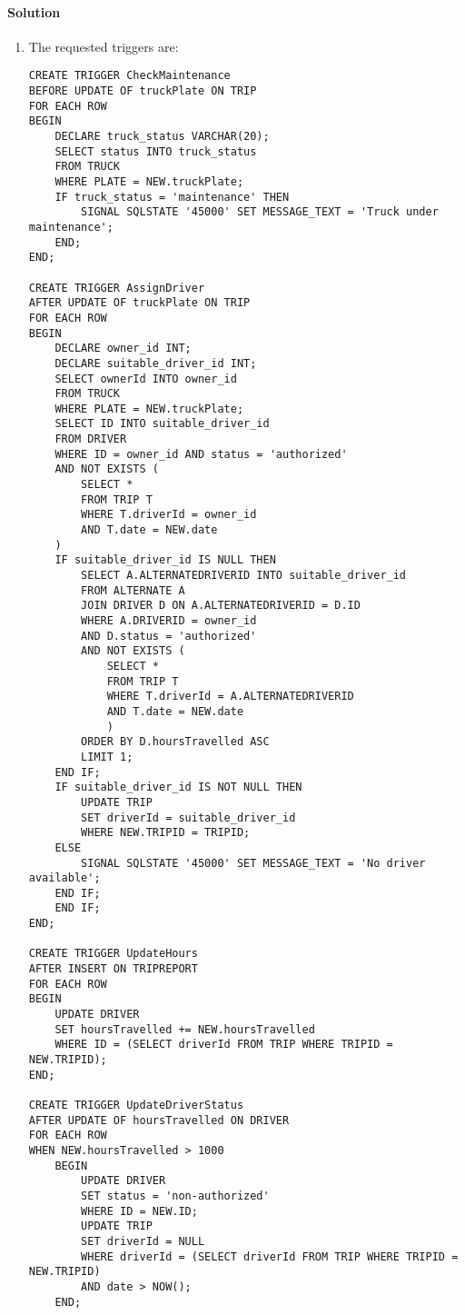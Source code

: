 \paragraph*{Solution}
\begin{enumerate}
    \item The requested triggers are: 
        \begin{lstlisting}[style=SQL]
CREATE TRIGGER CheckMaintenance
BEFORE UPDATE OF truckPlate ON TRIP
FOR EACH ROW
BEGIN
    DECLARE truck_status VARCHAR(20);
    SELECT status INTO truck_status
    FROM TRUCK
    WHERE PLATE = NEW.truckPlate;
    IF truck_status = 'maintenance' THEN
        SIGNAL SQLSTATE '45000' SET MESSAGE_TEXT = 'Truck under maintenance';
    END;
END;

CREATE TRIGGER AssignDriver
AFTER UPDATE OF truckPlate ON TRIP
FOR EACH ROW
BEGIN
    DECLARE owner_id INT;
    DECLARE suitable_driver_id INT;
    SELECT ownerId INTO owner_id
    FROM TRUCK
    WHERE PLATE = NEW.truckPlate;
    SELECT ID INTO suitable_driver_id
    FROM DRIVER
    WHERE ID = owner_id AND status = 'authorized'
    AND NOT EXISTS (
        SELECT *
        FROM TRIP T
        WHERE T.driverId = owner_id
        AND T.date = NEW.date
    )
    IF suitable_driver_id IS NULL THEN
        SELECT A.ALTERNATEDRIVERID INTO suitable_driver_id
        FROM ALTERNATE A
        JOIN DRIVER D ON A.ALTERNATEDRIVERID = D.ID
        WHERE A.DRIVERID = owner_id
        AND D.status = 'authorized'
        AND NOT EXISTS (
            SELECT *
            FROM TRIP T
            WHERE T.driverId = A.ALTERNATEDRIVERID
            AND T.date = NEW.date
            )
        ORDER BY D.hoursTravelled ASC
        LIMIT 1;
    END IF;
    IF suitable_driver_id IS NOT NULL THEN
        UPDATE TRIP
        SET driverId = suitable_driver_id
        WHERE NEW.TRIPID = TRIPID;
    ELSE
        SIGNAL SQLSTATE '45000' SET MESSAGE_TEXT = 'No driver available';
    END IF;
    END IF;
END;

CREATE TRIGGER UpdateHours
AFTER INSERT ON TRIPREPORT
FOR EACH ROW
BEGIN
    UPDATE DRIVER
    SET hoursTravelled += NEW.hoursTravelled
    WHERE ID = (SELECT driverId FROM TRIP WHERE TRIPID = NEW.TRIPID);
END;

CREATE TRIGGER UpdateDriverStatus
AFTER UPDATE OF hoursTravelled ON DRIVER
FOR EACH ROW
WHEN NEW.hoursTravelled > 1000
    BEGIN
        UPDATE DRIVER
        SET status = 'non-authorized'
        WHERE ID = NEW.ID;
        UPDATE TRIP
        SET driverId = NULL
        WHERE driverId = (SELECT driverId FROM TRIP WHERE TRIPID = NEW.TRIPID)
        AND date > NOW();
    END;
        \end{lstlisting}
\end{enumerate}